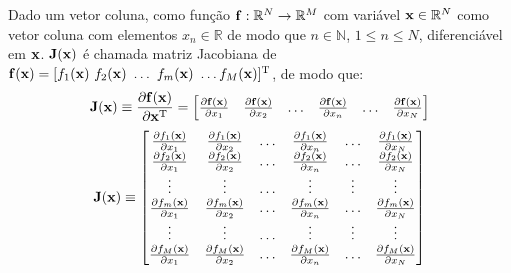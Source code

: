 \begin{proposition}\label{def:jacobian}
 Dado um vetor coluna, como função $\VECTOR{f}:\mathbb{R}^{N}\rightarrow \mathbb{R}^{M}$ com variável $\VECTOR{x} \in \mathbb{R}^{N}$
 como vetor coluna com elementos $x_n\in \mathbb{R}$ de modo que $n\in \mathbb{N}$, $1 \leq n \leq N$,
 diferenciável em $\VECTOR{x}$. 
 $\MATRIX{J}(\VECTOR{x})$ é chamada matriz Jacobiana \cite{Jacobian} \FALTAREFERENCIA   de 
 $\VECTOR{f}(\VECTOR{x})=[f_1(\VECTOR{x})~f_2(\VECTOR{x})~\dots~f_m(\VECTOR{x})~\dots f_M(\VECTOR{x})]^{\transpose}$, de modo que: 
 \begin{equation}
  \MATRIX{J}(\VECTOR{x})\equiv \frac{\partial \VECTOR{f}(\VECTOR{x})}{\partial \VECTOR{x}^{\transpose} }=
\left[
\begin{matrix}
\frac{\partial \VECTOR{f}(\VECTOR{x}) }{\partial x_{1}}&
\frac{\partial \VECTOR{f}(\VECTOR{x}) }{\partial x_{2}}&
\hdots&
\frac{\partial \VECTOR{f}(\VECTOR{x}) }{\partial x_{n}}&
\hdots&
\frac{\partial \VECTOR{f}(\VECTOR{x}) }{\partial x_{N}}
\end{matrix}
\right]
 \end{equation}
  \begin{equation}
  \MATRIX{J}(\VECTOR{x})\equiv 
\left[
\begin{matrix}
\frac{\partial f_1(\VECTOR{x}) }{\partial x_{1}}&
\frac{\partial f_1(\VECTOR{x}) }{\partial x_{2}}&
\hdots&
\frac{\partial f_1(\VECTOR{x}) }{\partial x_{n}}&
\hdots&
\frac{\partial f_1(\VECTOR{x}) }{\partial x_{N}}\\
\frac{\partial f_2(\VECTOR{x}) }{\partial x_{1}}&
\frac{\partial f_2(\VECTOR{x}) }{\partial x_{2}}&
\hdots&
\frac{\partial f_2(\VECTOR{x}) }{\partial x_{n}}&
\hdots&
\frac{\partial f_2(\VECTOR{x}) }{\partial x_{N}}\\
\vdots&
\vdots&
\hdots&
\vdots&
\vdots&
\vdots\\
\frac{\partial f_m(\VECTOR{x}) }{\partial x_{1}}&
\frac{\partial f_m(\VECTOR{x}) }{\partial x_{2}}&
\hdots&
\frac{\partial f_m(\VECTOR{x}) }{\partial x_{n}}&
\hdots&
\frac{\partial f_m(\VECTOR{x}) }{\partial x_{N}}\\
\vdots&
\vdots&
\hdots&
\vdots&
\vdots&
\vdots\\
\frac{\partial f_M(\VECTOR{x}) }{\partial x_{1}}&
\frac{\partial f_M(\VECTOR{x}) }{\partial x_{2}}&
\hdots&
\frac{\partial f_M(\VECTOR{x}) }{\partial x_{n}}&
\hdots&
\frac{\partial f_M(\VECTOR{x}) }{\partial x_{N}}\\
\end{matrix}
\right]
 \end{equation}
\end{proposition}

